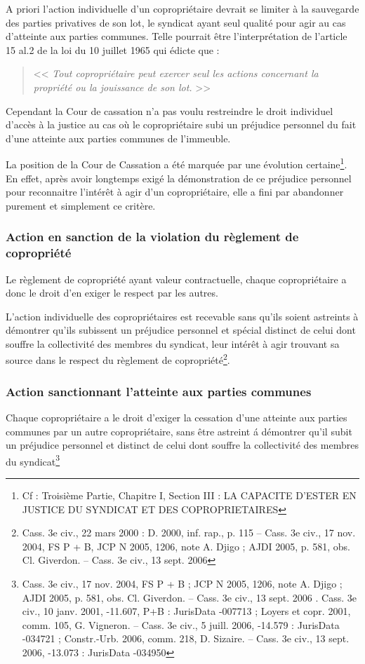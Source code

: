 		A priori l'action individuelle d'un copropriétaire devrait se limiter à la sauvegarde des parties privatives de son lot, le syndicat ayant seul qualité pour agir au cas d'atteinte aux parties communes. Telle pourrait être l'interprétation de l'article 15 al.2 de la loi du 10 juillet 1965 qui édicte que :
		\begin{quote}
			<< {\itshape Tout copropriétaire peut exercer seul les actions concernant la propriété ou la jouissance de son lot.} >>
		\end{quote}
		
		Cependant la Cour de cassation n'a pas voulu restreindre le droit individuel d'accès à la justice au cas où le copropriétaire subi un préjudice personnel du fait d'une atteinte aux parties communes de l'immeuble.
		
		La position de la Cour de Cassation a été marquée par une évolution certaine\footnote{Cf : Troisième Partie, Chapitre I, Section III : LA CAPACITE D’ESTER EN JUSTICE DU SYNDICAT ET DES COPROPRIETAIRES}. En effet, après avoir longtemps exigé la démonstration de ce préjudice personnel pour reconnaitre l’intérêt à agir d’un copropriétaire, elle a fini par abandonner purement et simplement ce critère.
		
		\subsubsection{Action en sanction de la violation du règlement de copropriété}
		
			Le règlement de copropriété ayant valeur contractuelle, chaque copropriétaire a donc le droit d'en exiger le respect par les autres.
			
			L'action individuelle des copropriétaires est recevable sans qu'ils soient astreints à démontrer qu'ils subissent un préjudice personnel et spécial distinct de celui dont souffre la collectivité des membres du syndicat, leur intérêt à agir trouvant sa source dans le respect du règlement de copropriété\footnote{Cass. 3e civ., 22 mars 2000 : D. 2000, inf. rap., p. 115 – Cass. 3e civ., 17 nov. 2004, FS P + B, JCP N 2005, 1206, note A. Djigo ; AJDI 2005, p. 581, obs. Cl. Giverdon. – Cass. 3e civ., 13 sept. 2006}.
		
		\subsubsection{Action sanctionnant l’atteinte aux parties communes}
		
			Chaque copropriétaire a le droit d'exiger la cessation d'une atteinte aux parties communes par un autre copropriétaire, sans être astreint á démontrer qu'il subit un préjudice personnel et distinct de celui dont souffre la collectivité des membres du syndicat\footnote{Cass. 3e civ., 17 nov. 2004, FS P + B ; JCP N 2005, 1206, note A. Djigo ; AJDI 2005, p. 581, obs. Cl. Giverdon. – Cass. 3e civ., 13 sept. 2006 . Cass. 3e civ., 10 janv. 2001, -11.607, P+B : JurisData -007713 ; Loyers et copr. 2001, comm. 105, G. Vigneron. – Cass. 3e civ., 5 juill. 2006, -14.579 : JurisData -034721 ; Constr.-Urb. 2006, comm. 218, D. Sizaire. – Cass. 3e civ., 13 sept. 2006, -13.073 : JurisData -034950}
	
